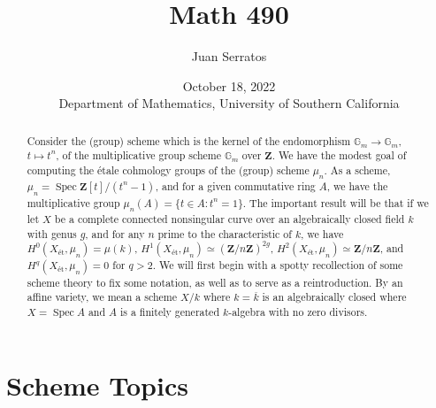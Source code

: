 \documentclass[oneside]{amsart}
\title{Math 490}
\author{Juan Serratos}
\date{October 18, 2022 \\ {Department of Mathematics, University of Southern California}}
\theoremstyle{definition}
\DeclareMathOperator{\spec}{Spec}
\newcommand{\zz}{\mathbf Z}
\begin{document}
\maketitle
\begin{abstract} Consider the (group) scheme which is the kernel of the endomorphism $\mathbb G_m \to \mathbb G_m$, $t \mapsto t^n$, of the multiplicative group scheme $\mathbb G_m$ over $\zz$. We have the modest goal of computing the \'etale cohmology groups of the (group) scheme $\mu_n$. As a scheme, $\mu_n = \spec \zz [t]/(t^n-1)$, and for a given commutative ring $A$, we have the multiplicative group $\mu_n(A) = \{ t \in A \colon t^n = 1\}$. The important result will be that if we let $X$ be a complete connected nonsingular curve over an algebraically closed field $k$ with genus $g$, and for any $n$ prime to the characteristic of $k$, we have $H^0 (X_{\text{\'et}}, \mu_n) = \mu (k)$, $H^1(X_{\text{\'et}}, \mu_n) \simeq (\zz / n \zz)^{2g}$, $H^2(X_{\text{\'et}}, \mu_n) \simeq \zz / n \zz $, and $H^q (X_{\text{\'et}}, \mu_n) = 0$ for $q > 2$. We will first begin with a spotty recollection of some scheme theory to fix some notation, as well as to serve as a reintroduction. By an affine variety, we mean a scheme $X/k$ where $k = \overline{k}$ is an algebraically closed where $X = \spec A$ and $A$ is a finitely generated $k$-algebra with no zero divisors. 
	\end{abstract}
\tableofcontents
\setcounter{tocdepth}{4}
\setcounter{secnumdepth}{4}

\section{Scheme Topics}
\end{document}
